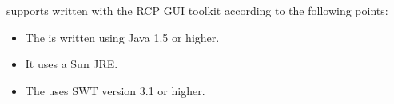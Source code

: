 \app{} supports \gdauts{} written with the RCP GUI toolkit according to the following points:


\begin{itemize}
\item The \gdaut{} is written using Java 1.5 or higher. 
\item It uses a Sun JRE.
\item The \gdaut{} uses SWT version 3.1 or higher. 
\end{itemize}
